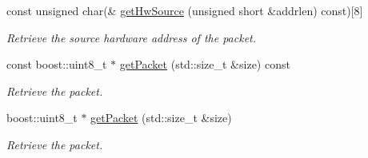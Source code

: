 \begin{DoxyCompactItemize}
const unsigned char(\& \hyperlink{classIPQ_1_1IpqPacket_a8582ae732d6b66ca1f5201994159a84a}{get\-Hw\-Source} (unsigned short \&addrlen) const)\mbox{[}8\mbox{]}
\begin{DoxyCompactList}\small\item\em \-Retrieve the source hardware address of the packet. \end{DoxyCompactList}\item 
const boost\-::uint8\-\_\-t $\ast$ \hyperlink{classIPQ_1_1IpqPacket_a6dd7baeec66082658d882bff8862eb6c}{get\-Packet} (std\-::size\-\_\-t \&size) const 
\begin{DoxyCompactList}\small\item\em \-Retrieve the packet. \end{DoxyCompactList}\item 
boost\-::uint8\-\_\-t $\ast$ \hyperlink{classIPQ_1_1IpqPacket_a0bf3344a9eed5e2f6bc20890ffffe26e}{get\-Packet} (std\-::size\-\_\-t \&size)
\begin{DoxyCompactList}\small\item\em \-Retrieve the packet. \end{DoxyCompactList}\end{DoxyCompactItemize}
